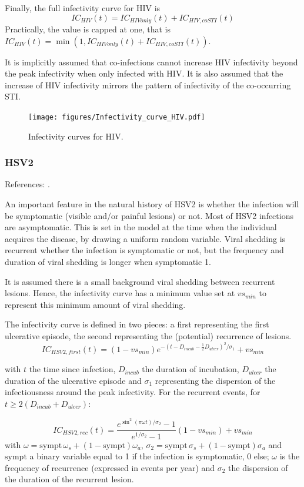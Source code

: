 \documentclass[11pt, onecolumn]{article}
\begin{document}
Finally, the full infectivity curve for HIV is
$$ IC_{HIV}(t) = IC_{HIVonly}(t)+IC_{HIV,coSTI}(t)$$
Practically, the value is capped at one, that is $ IC_{HIV}(t) = \min(1,IC_{HIVonly}(t)+IC_{HIV,coSTI}(t))$. 

It is implicitly assumed that co-infections cannot increase HIV infectivity beyond the peak infectivity when only infected with HIV. It is also assumed that the increase of HIV infectivity mirrors the pattern of infectivity of the co-occurring STI.

\begin{figure}[!ht]
\centering
    \texttt{[image: figures/Infectivity\_curve\_HIV.pdf]}
\caption{Infectivity curves for HIV.}
\label{fig:InfectivityCurves}
\end{figure}


\subsubsection{HSV2}

References: \cite{Tronstein:2011vs,Schiffer:2014cc}.

An important feature in the natural history of HSV2 is whether the infection will be symptomatic (visible and/or painful lesions) or not.
Most of HSV2 infections are asymptomatic. This is set in the model at the time when the individual acquires the disease, by drawing a uniform random variable. Viral shedding is recurrent whether the infection is symptomatic or not, but the frequency and duration of viral shedding is longer when symptomatic 1. 

It is assumed there is a small background viral shedding between recurrent lesions. Hence, the infectivity curve has a minimum value set at $vs_{min}$ to represent this minimum amount of viral shedding. 

The infectivity curve is defined in two pieces: a first representing the first ulcerative episode, the second representing the (potential) recurrence of lesions.
$$IC_{HSV2,first}(t) = (1-vs_{min})e^{-(t-D_{incub}-\frac{1}{2}D_{ulcer})^2 / \sigma_1}+vs_{min}$$

with $t$ the time since infection, $D_{incub}$ the duration of incubation, $D_{ulcer}$ the duration of the ulcerative episode and $\sigma_1$ representing the dispersion of the infectiousness around the peak infectivity.
For the recurrent events, for $t \geq 2(D_{incub}+D_{ulcer})$:

$$ IC_{HSV2,rec}(t) =  \frac{e^{\sin^2(\pi\omega t)/\sigma_2}-1}{e^{1/\sigma_2}-1}  (1-vs_{min})+ vs_{min}$$
with $\omega = \mathrm{sympt}\,\omega_s + (1- \mathrm{sympt})\omega_a$, $\sigma_2 = \mathrm{sympt}\,\sigma_s + (1- \mathrm{sympt})\sigma_a$ and  $ \mathrm{sympt}$ a binary variable equal to 1 if the infection is symptomatic, 0 else; $\omega$ is the frequency of recurrence (expressed in events per year) and $\sigma_2$ the dispersion of the duration of the recurrent lesion.
\end{document}
